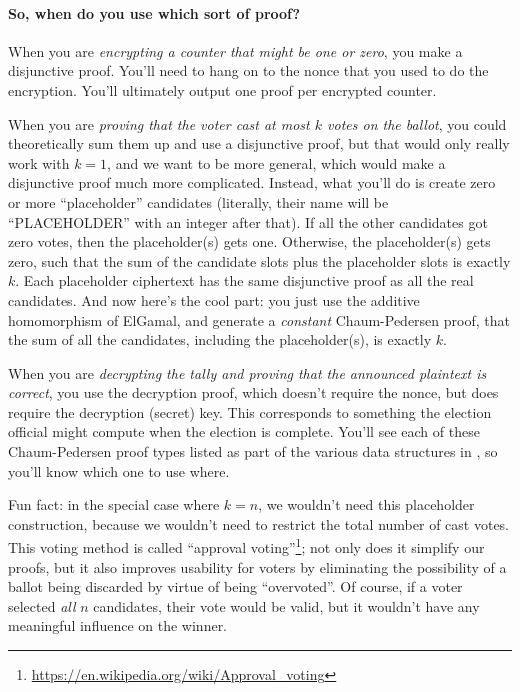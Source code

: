 \paragraph{So, when do you use which sort of proof?}
When you are {\em encrypting a counter that might be one or zero}, you
make a disjunctive proof. You'll need to hang on to the nonce that you
used to do the encryption. You'll ultimately output one proof per encrypted
counter.

When you are {\em proving that the voter cast at most $k$ votes on the ballot},
you could theoretically sum them up and use a disjunctive proof, but
that would only really work with $k=1$, and we want to be more
general, which would make a disjunctive proof
much more complicated. Instead, what you'll do is create zero or more
``placeholder'' candidates (literally, their name will be
``PLACEHOLDER'' with an integer after that). If all the other candidates got zero votes, then the
placeholder(s) gets one. Otherwise, the placeholder(s) gets zero, such
that the sum of the candidate slots plus the placeholder slots is
exactly $k$. Each
placeholder ciphertext has the same disjunctive proof as all the real candidates.
And now here's the cool part: you just use the additive homomorphism
of ElGamal, and generate a {\em constant} Chaum-Pedersen proof, that
the sum of all the candidates, including the placeholder(s), is exactly
$k$.

When you are {\em decrypting the tally and proving that the announced
  plaintext is correct}, you use the decryption proof, which doesn't
require the nonce, but does require the decryption (secret) key. This
corresponds to something the election official might compute when the
election is complete. You'll see each of these Chaum-Pedersen proof
types listed as part of the various data structures in
,
so you'll know which one to use where.

Fun fact: in the special case where $k=n$, we wouldn't need this
placeholder construction, because we wouldn't need to restrict the total
number of cast votes. This voting method is called ``approval
voting''\footnote{\url{https://en.wikipedia.org/wiki/Approval_voting}};
not only does it simplify our proofs, but it also improves usability for voters by
eliminating the possibility of a ballot being discarded by virtue of
being ``overvoted''. Of course, if a voter selected {\em all} $n$
candidates, their vote would be valid, but it wouldn't have any meaningful
influence on the winner.

